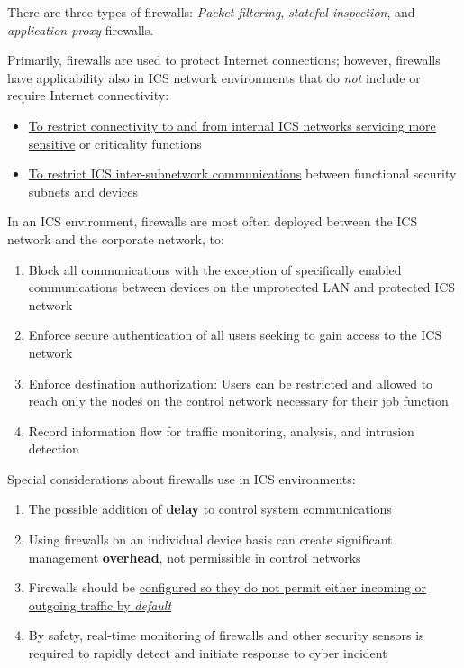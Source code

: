 There are three types of firewalls: \textit{Packet filtering}, \textit{stateful inspection}, and \textit{application-proxy} firewalls.

Primarily, firewalls are used to protect Internet connections; however, firewalls have applicability also in ICS network environments that do \textit{not} include or require Internet connectivity:
\begin{itemize}
   \item \ul{To restrict connectivity to and from internal ICS networks servicing more sensitive} or criticality functions
	\item \ul{To restrict ICS inter-subnetwork communications} between functional security subnets and devices
\end{itemize}


In an ICS environment, firewalls are most often deployed between the ICS network and the corporate network, to:
\begin{enumerate}
	\item Block all communications with the exception of specifically enabled communications between devices on the unprotected LAN and protected ICS network
	\item Enforce secure authentication of all users seeking to gain access to the ICS network
	\item Enforce destination authorization: Users can be restricted and allowed to reach only the nodes on the control network necessary for their job function
	\item Record information flow for traffic monitoring, analysis, and intrusion detection
\end{enumerate}

Special considerations about firewalls use in ICS environments:
\begin{enumerate}
	\item The possible addition of \textbf{delay} to control system communications
	\item Using firewalls on an individual device basis can create significant management \textbf{overhead}, not permissible in control networks
	\item Firewalls should be \ul{configured so they do not permit either incoming or outgoing traffic by \textit{default}}
	\item By safety, real-time monitoring of firewalls and other security sensors is required to rapidly detect and initiate response to cyber incident
\end{enumerate}

